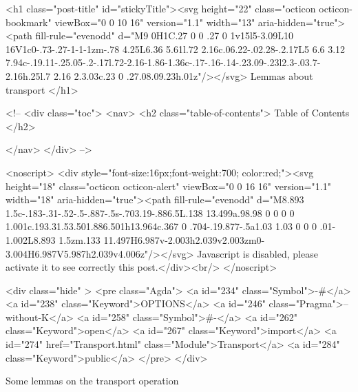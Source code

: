  <h1 class="post-title" id="stickyTitle"><svg height="22" class="octicon octicon-bookmark" viewBox="0 0 10 16" version="1.1" width="13" aria-hidden="true"><path fill-rule="evenodd" d="M9 0H1C.27 0 0 .27 0 1v15l5-3.09L10 16V1c0-.73-.27-1-1-1zm-.78 4.25L6.36 5.61l.72 2.16c.06.22-.02.28-.2.17L5 6.6 3.12 7.94c-.19.11-.25.05-.2-.17l.72-2.16-1.86-1.36c-.17-.16-.14-.23.09-.23l2.3-.03.7-2.16h.25l.7 2.16 2.3.03c.23 0 .27.08.09.23h.01z"/></svg> Lemmas about transport 
  </h1>

  <!-- 
  <div class="toc">
    <nav>
    <h2 class="table-of-contents"> Table of Contents </h2>
      

    </nav>
  </div>
   -->

  <noscript>
  <div style="font-size:16px;font-weight:700; color:red;"><svg height="18" class="octicon octicon-alert" viewBox="0 0 16 16" version="1.1" width="18" aria-hidden="true"><path fill-rule="evenodd" d="M8.893 1.5c-.183-.31-.52-.5-.887-.5s-.703.19-.886.5L.138 13.499a.98.98 0 0 0 0 1.001c.193.31.53.501.886.501h13.964c.367 0 .704-.19.877-.5a1.03 1.03 0 0 0 .01-1.002L8.893 1.5zm.133 11.497H6.987v-2.003h2.039v2.003zm0-3.004H6.987V5.987h2.039v4.006z"/></svg> Javascript is disabled, please activate it to see correctly this post.</div><br/>
  </noscript>

  <div class="hide" >
<pre class="Agda">
<a id="234" class="Symbol">{-#</a> <a id="238" class="Keyword">OPTIONS</a> <a id="246" class="Pragma">--without-K</a> <a id="258" class="Symbol">#-}</a>
<a id="262" class="Keyword">open</a> <a id="267" class="Keyword">import</a> <a id="274" href="Transport.html" class="Module">Transport</a> <a id="284" class="Keyword">public</a>
</pre>
</div>

Some lemmas on the transport operation

